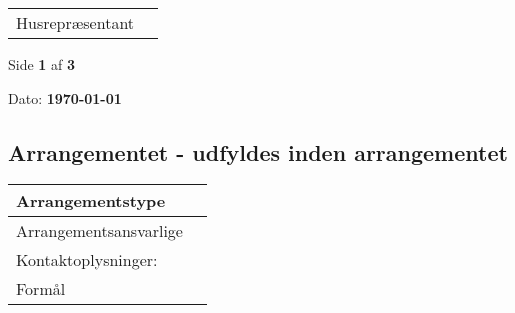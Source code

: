 \documentclass[a4paper, 11pt]{article}
\begin{document}
{{{{{{{{{{{{\begin{tabular}{|l|l|}
\begin{minipage}[t]{0.47\textwidth}
    \end{minipage} \\
    \hline
    \begin{minipage}[t]{0.47\textwidth}
        Husrepræsentant
        \vspace{0.5cm}
    \end{minipage} &
    \begin{minipage}[t]{0.47\textwidth}

    \end{minipage} \\
    \hline
\end{tabular}

\vfill

\begin{center}
    Side \textbf{1} af \textbf{3}
\end{center}

\newpage


\noindent
\small{Dato: \textbf{\today} }

\subsection*{Arrangementet - udfyldes inden arrangementet}

\begin{tabular}{|l|l|}
    \hline
    \begin{minipage}[t]{0.47\textwidth}
        Arrangementstype
        \vspace{0.5cm}
    \end{minipage} &
    \begin{minipage}[t]{0.47\textwidth}

    \end{minipage} \\
    \hline
    \begin{minipage}[t]{0.47\textwidth}
        Arrangementsansvarlige
        \vspace{0.5cm}
    \end{minipage} &
    \begin{minipage}[t]{0.47\textwidth}
        Navn: \\
        Kontaktoplysninger:
    \end{minipage} \\
    \hline
    \begin{minipage}[t]{0.47\textwidth}
        Formål
        \vspace{0.5cm}
    \end{minipage} &
    \begin{minipage}[t]{0.47\textwidth}


\end{minipage}
\end{tabular}}}}}}}}}}}}}
\end{document}
